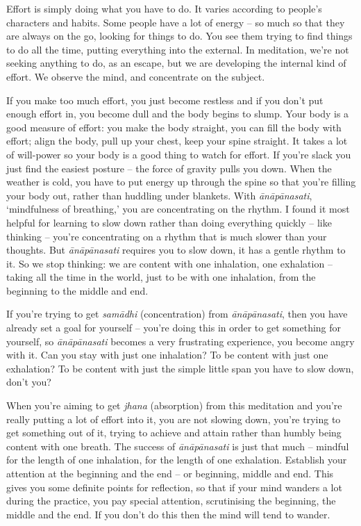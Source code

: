 
Effort is simply doing what you have to do. It varies according to people's characters and habits. Some people have a lot of energy -- so much so that they are always on the go, looking for things to do. You see them trying to find things to do all the time, putting everything into the external. In meditation, we're not seeking anything to do, as an escape, but we are developing the internal kind of effort. We observe the mind, and concentrate on the subject.

If you make too much effort, you just become restless and if you don't put enough effort in, you become dull and the body begins to slump. Your body is a good measure of effort: you make the body straight, you can fill the body with effort; align the body, pull up your chest, keep your spine straight. It takes a lot of will-power so your body is a good thing to watch for effort. If you're slack you just find the easiest posture -- the force of gravity pulls you down. When the weather is cold, you have to put energy up through the spine so that you're filling your body out, rather than huddling under blankets. With \textit{\=an\=ap\=anasati}, `mindfulness of breathing,' you are concentrating on the rhythm. I found it most helpful for learning to slow down rather than doing everything quickly -- like thinking -- you're concentrating on a rhythm that is much slower than your thoughts. But \textit{\=an\=ap\=anasati} requires you to slow down, it has a gentle rhythm to it. So we stop thinking: we are content with one inhalation, one exhalation -- taking all the time in the world, just to be with one inhalation, from the beginning to the middle and end.

If you're trying to get \textit{sam\=adhi} (concentration) from \textit{\=an\=ap\=anasati}, then you have already set a goal for yourself -- you're doing this in order to get something for yourself, so \textit{\=an\=ap\=anasati} becomes a very frustrating experience, you become angry with it. Can you stay with just one inhalation? To be content with just one exhalation? To be content with just the simple little span you have to slow down, don't you?

When you're aiming to get \textit{jhana} (absorption) from this meditation and you're really putting a lot of effort into it, you are not slowing down, you're trying to get something out of it, trying to achieve and attain rather than humbly being content with one breath. The success of \textit{\=an\=ap\=anasati} is just that much -- mindful for the length of one inhalation, for the length of one exhalation. Establish your attention at the beginning and the end -- or beginning, middle and end. This gives you some definite points for reflection, so that if your mind wanders a lot during the practice, you pay special attention, scrutinising the beginning, the middle and the end. If you don't do this then the mind will tend to wander.

